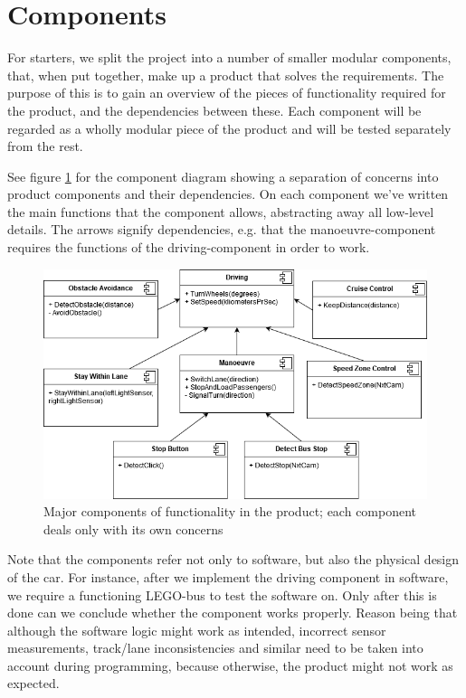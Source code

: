 \section{Components}


For starters, we split the project into a number of smaller modular components, that, when put together, make up a product that solves the requirements. The purpose of this is to gain an overview of the pieces of functionality required for the product, and the dependencies between these. Each component will be regarded as a wholly modular piece of the product and will be tested separately from the rest. 


See figure \ref{fig:components} for the component diagram showing a separation of concerns into product components and their dependencies. On each component we've written the main functions that the component allows, abstracting away all low-level details. The arrows signify dependencies, e.g. that the manoeuvre-component requires the functions of the driving-component in order to work. 

\begin{figure}[ht]
    \includegraphics[width=\textwidth]{Images/Design/componentDiagram.png}
    \caption{Major components of functionality in the product; each component deals only with its own concerns}
    \label{fig:components}
\end{figure}

Note that the components refer not only to software, but also the physical design of the car. For instance, after we implement the driving component in software, we require a functioning LEGO-bus to test the software on. Only after this is done can we conclude whether the component works properly. Reason being that although the software logic might work as intended, incorrect sensor measurements, track/lane inconsistencies and similar need to be taken into account during programming, because otherwise, the product might not work as expected.

